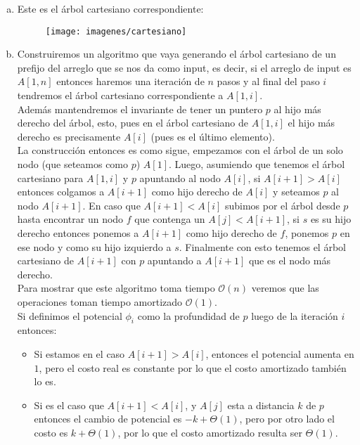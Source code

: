 \documentclass[dcc,uchile]{fcfmcourse}
\theoremstyle{plain}
\theoremstyle{definition}
\begin{document}
\begin{problems}
\item 
\begin{enumerate}[a)]
    \item Este es el árbol cartesiano correspondiente:
    \begin{figure}[h]
        \centering
        \texttt{[image: imagenes/cartesiano]}
    \end{figure}
    \item Construiremos un algoritmo que vaya generando el árbol cartesiano de un prefijo del arreglo que se nos da como input, es decir, si el arreglo de input es $A[1,n]$ entonces haremos una iteración de $n$ pasos y al final del paso $i$ tendremos el árbol cartesiano correspondiente a $A[1,i]$.\\

Además mantendremos el invariante de tener un puntero $p$ al hijo más derecho del árbol, esto, pues en el árbol cartesiano de $A[1,i]$ el hijo más derecho es precisamente $A[i]$ (pues es el último elemento).
\\

La construcción entonces es como sigue, empezamos con el árbol de un solo nodo (que seteamos como $p$) $A[1]$. Luego, asumiendo que tenemos el árbol cartesiano para $A[1,i]$ y $p$ apuntando al nodo $A[i]$, si $A[i+1] > A[i]$ entonces colgamos a $A[i+1]$ como hijo derecho de $A[i]$ y seteamos $p$ al nodo $A[i+1]$. En caso que $A[i+1] < A[i]$ subimos por el árbol desde $p$ hasta encontrar un nodo $f$ que contenga un $A[j] < A[i+1]$, si $s$ es su hijo derecho entonces ponemos a $A[i+1]$ como hijo derecho de $f$, ponemos $p$ en ese nodo y como su hijo izquierdo a $s$. Finalmente con esto tenemos el árbol cartesiano de $A[i+1]$ con $p$ apuntando a $A[i+1]$ que es el nodo más derecho.\\

Para mostrar que este algoritmo toma tiempo $\mathcal{O}(n)$ veremos que las operaciones toman tiempo amortizado $\mathcal{O}(1)$.\\

Si definimos el potencial $\phi_{i}$ como la profundidad de $p$ luego de la iteración $i$ entonces:

\begin{itemize}
\item Si estamos en el caso $A[i+1] > A[i]$, entonces el potencial aumenta en $1$, pero el costo real es constante por lo que el costo amortizado también lo es.
\item Si es el caso que $A[i+1] < A[i]$, y $A[j]$ esta a distancia $k$ de $p$ entonces el cambio de potencial es $-k+\Theta(1)$, pero por otro lado el costo es $k+\Theta(1)$, por lo que el costo amortizado resulta ser $\Theta(1)$.
\end{itemize}
\end{enumerate}
\end{problems}
\end{document}

